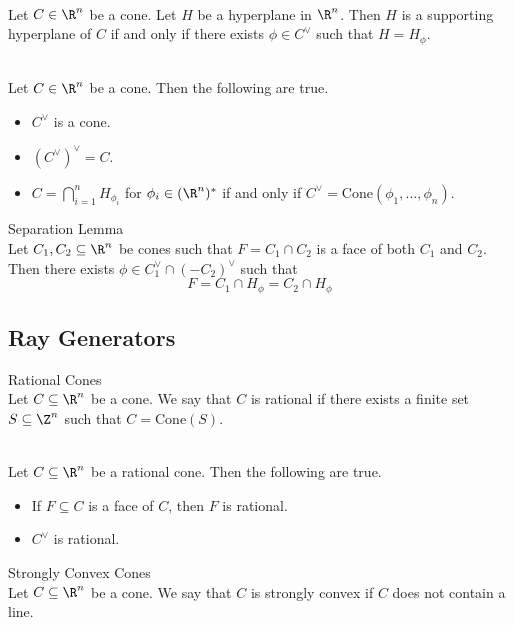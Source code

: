 \documentclass[a4paper]{article}
\begin{document}
\begin{lmm}{}{}\\
Let $C\in\R^n$ be a cone. Let $H$ be a hyperplane in $\R^n$. Then $H$ is a supporting hyperplane of $C$ if and only if there exists $\phi\in C^\vee$ such that $H=H_\phi$. 
\end{lmm}

\begin{lmm}{}{}\\
Let $C\in\R^n$ be a cone. Then the following are true. 
\begin{itemize}
\item $C^\vee$ is a cone. 
\item $(C^\vee)^\vee=C$. 
\item $C=\bigcap_{i=1}^nH_{\phi_i}$ for $\phi_i\in(\R^n)^\ast$ if and only if $C^\vee=\text{Cone}(\phi_1,\dots,\phi_n)$. 
\end{itemize}
\end{lmm}

\begin{lmm}{Separation Lemma}{}\\
Let $C_1,C_2\subseteq\R^n$ be cones such that $F=C_1\cap C_2$ is a face of both $C_1$ and $C_2$. Then there exists $\phi\in C_1^\vee\cap(-C_2)^\vee$ such that $$F=C_1\cap H_\phi=C_2\cap H_\phi$$
\end{lmm}

\subsection{Ray Generators}
\begin{defn}{Rational Cones}{}\\
Let $C\subseteq\R^n$ be a cone. We say that $C$ is rational if there exists a finite set $S\subseteq\Z^n$ such that $C=\text{Cone}(S)$. 
\end{defn}

\begin{lmm}{}{}\\
Let $C\subseteq\R^n$ be a rational cone. Then the following are true. 
\begin{itemize}
\item If $F\subseteq C$ is a face of $C$, then $F$ is rational. 
\item $C^\vee$ is rational. 
\end{itemize}
\end{lmm}

\begin{defn}{Strongly Convex Cones}{}\\
Let $C\subseteq\R^n$ be a cone. We say that $C$ is strongly convex if $C$ does not contain a line. 
\end{defn}
\end{document}
